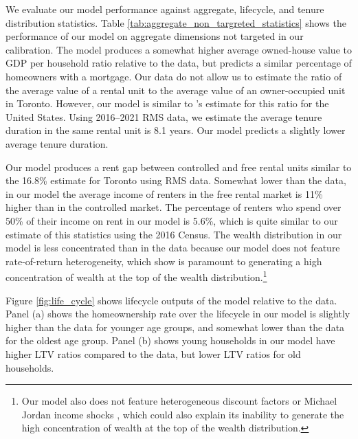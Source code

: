 \documentclass[parskip=full]{article}
\begin{document}
We evaluate our model performance against aggregate, lifecycle, and tenure distribution statistics. Table \ref{tab:aggregate_non_targreted_statistics} shows the performance of our model on aggregate dimensions not targeted in our calibration. The model produces a somewhat higher average owned-house value to GDP per household ratio relative to the data, but predicts a similar percentage of homeowners with a mortgage. Our data do not allow us to estimate the ratio of the average value of a rental unit to the average value of an owner-occupied unit in Toronto. However, our model is similar to \citet{chatterjee-eyigungor-2015}'s estimate for this ratio for the United States. Using 2016--2021 RMS data, we estimate the average tenure duration in the same rental unit is 8.1 years. Our model predicts a slightly lower average tenure duration. 

Our model produces a rent gap between controlled and free rental units similar to the 16.8\% \citet{zhang-gou} estimate for Toronto using RMS data. Somewhat lower than the data, in our model the average income of renters in the free rental market is 11\% higher than in the controlled market. The percentage of renters who spend over 50\% of their income on rent in our model is 5.6\%, which is quite similar to our estimate of this statistics using the 2016 Census. The wealth distribution in our model is less concentrated than in the data because our model does not feature rate-of-return heterogeneity, which \citet{fagereng} show is paramount to generating a high concentration of wealth at the top of the wealth distribution.\footnote{Our model also does not feature heterogeneous discount factors \citep{ks-1998} or Michael Jordan income shocks \citep{mj-shocks}, which could also explain its inability to generate the high concentration of wealth at the top of the wealth distribution.}

Figure \ref{fig:life_cycle} shows lifecycle outputs of the model relative to the data. Panel (a) shows the homeownership rate over the lifecycle in our model is slightly higher than the data for younger age groups, and somewhat lower than the data for the oldest age group. Panel (b) shows young households in our model have higher LTV ratios compared to the data, but lower LTV ratios for old households. 
\end{document}
